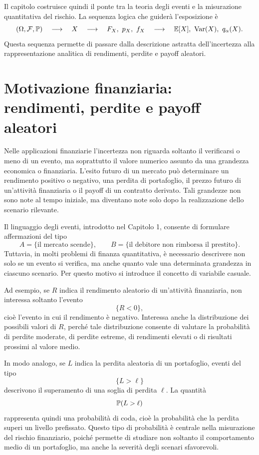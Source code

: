 Il capitolo costruisce quindi il ponte tra la teoria degli eventi e la
misurazione quantitativa del rischio. La sequenza logica che guider\`{a}
l'esposizione \`{e}
\[
(\Omega,\mathcal{F},\mathbb{P}) \quad\longrightarrow\quad X \quad
\longrightarrow\quad F_{X},\ p_{X},\ f_{X} \quad\longrightarrow\quad
\mathbb{E}[X],\ \operatorname{Var}(X),\ q_{\alpha}(X).
\]
Questa sequenza permette di passare dalla descrizione astratta dell'incertezza
alla rappresentazione analitica di rendimenti, perdite e payoff aleatori.

\section{Motivazione finanziaria: rendimenti, perdite e payoff aleatori}

\label{sec:cap2-motivazione-finanziaria}

Nelle applicazioni finanziarie l'incertezza non riguarda soltanto il
verificarsi o meno di un evento, ma soprattutto il valore numerico assunto da
una grandezza economica o finanziaria. L'esito futuro di un mercato pu\`{o}
determinare un rendimento positivo o negativo, una perdita di portafoglio, il
prezzo futuro di un'attivit\`{a} finanziaria o il payoff di un contratto
derivato. Tali grandezze non sono note al tempo iniziale, ma diventano note
solo dopo la realizzazione dello scenario rilevante.

Il linguaggio degli eventi, introdotto nel Capitolo 1, consente di formulare
affermazioni del tipo
\[
A=\{\text{il mercato scende}\}, \qquad B=\{\text{il debitore non rimborsa il
prestito}\}.
\]
Tuttavia, in molti problemi di finanza quantitativa, \`{e} necessario
descrivere non solo se un evento si verifica, ma anche quanto vale una
determinata grandezza in ciascuno scenario. Per questo motivo si introduce il
concetto di variabile casuale.

Ad esempio, se $R$ indica il rendimento aleatorio di un'attivit\`{a}
finanziaria, non interessa soltanto l'evento
\[
\{R<0\},
\]
cio\`{e} l'evento in cui il rendimento \`{e} negativo. Interessa anche la
distribuzione dei possibili valori di $R$, perch\'{e} tale distribuzione
consente di valutare la probabilit\`{a} di perdite moderate, di perdite
estreme, di rendimenti elevati o di risultati prossimi al valore medio.

In modo analogo, se $L$ indica la perdita aleatoria di un portafoglio, eventi
del tipo
\[
\{L>\ell\}
\]
descrivono il superamento di una soglia di perdita $\ell$. La quantit\`{a}
\[
\mathbb{P}(L>\ell)
\]
rappresenta quindi una probabilit\`{a} di coda, cio\`{e} la probabilit\`{a}
che la perdita superi un livello prefissato. Questo tipo di probabilit\`{a}
\`{e} centrale nella misurazione del rischio finanziario, poich\'{e} permette
di studiare non soltanto il comportamento medio di un portafoglio, ma anche la
severit\`{a} degli scenari sfavorevoli.

